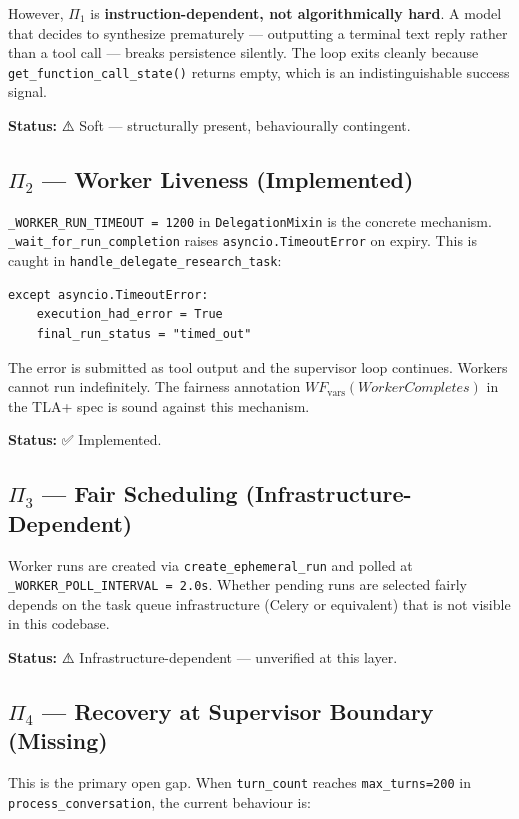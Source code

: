 However, $\Pi_1$ is \textbf{instruction-dependent, not algorithmically hard}.
A model that decides to synthesize prematurely — outputting a terminal text reply
rather than a tool call — breaks persistence silently. The loop exits cleanly
because \texttt{get\_function\_call\_state()} returns empty, which is an
indistinguishable success signal.

\textbf{Status:} ⚠️ Soft — structurally present, behaviourally contingent.

\subsection*{$\Pi_2$ — Worker Liveness (Implemented)}

\texttt{\_WORKER\_RUN\_TIMEOUT = 1200} in \texttt{DelegationMixin} is the
concrete mechanism. \texttt{\_wait\_for\_run\_completion} raises
\texttt{asyncio.TimeoutError} on expiry. This is caught in
\texttt{handle\_delegate\_research\_task}:

\begin{verbatim}
except asyncio.TimeoutError:
    execution_had_error = True
    final_run_status = "timed_out"
\end{verbatim}

The error is submitted as tool output and the supervisor loop continues.
Workers cannot run indefinitely. The fairness annotation $WF_{\text{vars}}(WorkerCompletes)$
in the TLA+ spec is sound against this mechanism.

\textbf{Status:} ✅ Implemented.

\subsection*{$\Pi_3$ — Fair Scheduling (Infrastructure-Dependent)}

Worker runs are created via \texttt{create\_ephemeral\_run} and polled at
\texttt{\_WORKER\_POLL\_INTERVAL = 2.0s}. Whether pending runs are selected
fairly depends on the task queue infrastructure (Celery or equivalent)
that is not visible in this codebase.

\textbf{Status:} ⚠️ Infrastructure-dependent — unverified at this layer.

\subsection*{$\Pi_4$ — Recovery at Supervisor Boundary (Missing)}

This is the primary open gap. When \texttt{turn\_count} reaches \texttt{max\_turns=200}
in \texttt{process\_conversation}, the current behaviour is:

